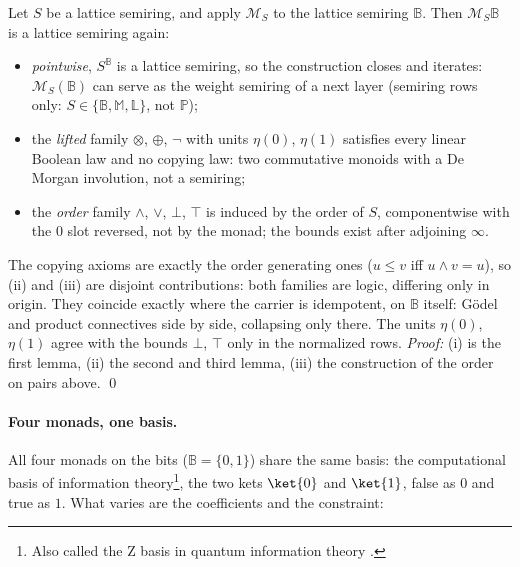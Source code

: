 \documentclass[anon]{../../journal-templates/NeSy26/nesy2026} %
\begin{document}
\begin{theorem}
Let $S$ be a lattice semiring, and apply
$\mathcal M_S$ to the lattice semiring
$\mathbb B$. Then $\mathcal M_S\mathbb B$ is a lattice semiring
again:
\begin{itemize}
\item[(i)] \emph{pointwise}, $S^{\mathbb B}$ is a lattice semiring, so the construction closes and iterates:
$\mathcal M_S(\mathbb B)$ can serve as the weight semiring of a next
layer (semiring rows only: $S \in \{\mathbb B, \mathbb M, \mathbb L\}$,
not $\mathbb P$);
\item[(ii)] the \emph{lifted} family $\otimes$, $\oplus$, $\neg$ with
units $\eta(0)$, $\eta(1)$ satisfies every linear Boolean law and no
copying law: two commutative monoids with a De Morgan involution, not a
semiring;
\item[(iii)] the \emph{order} family $\wedge$, $\vee$, $\bot$, $\top$
is induced by the order of $S$, componentwise with the $0$ slot
reversed, not by the monad; the bounds exist after adjoining $\infty$.
\end{itemize}
The copying axioms are exactly the order generating ones ($u \le v$ iff
$u \wedge v = u$), so (ii) and (iii) are disjoint contributions: both
families are logic, differing only in origin. They coincide exactly
where the carrier is idempotent, on $\mathbb B$ itself: G\"odel and
product connectives side by side, collapsing only there. The units
$\eta(0)$, $\eta(1)$ agree with the bounds $\bot$, $\top$ only in the
normalized rows.
\emph{Proof:} (i) is the first lemma, (ii) the second and third lemma,
(iii) the construction of the order on pairs above. \qed
\end{theorem}

\paragraph{Four monads, one basis.} All four monads on the
bits ($\mathbb B = \{0, 1\}$) share the same basis: the computational basis of information theory\footnote{Also called the Z basis in
quantum information theory \citep{heunenCategoriesQuantumTheory2019}.}, the two kets $\ket{0}$ and $\ket{1}$,
false as $0$ and true as $1$. What varies are the coefficients and the constraint:
\end{document}
